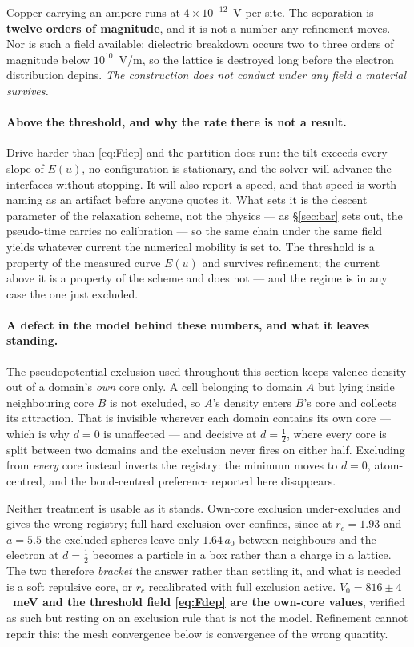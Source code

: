 \documentclass[11pt]{article}
\begin{document}
Copper carrying an ampere runs at $4\times10^{-12}$~V per site. The separation is \textbf{twelve
orders of magnitude}, and it is not a number any refinement moves. Nor is such a field available:
dielectric breakdown occurs two to three orders of magnitude below $10^{10}$~V/m, so the lattice is
destroyed long before the electron distribution depins. \emph{The construction does not conduct
under any field a material survives.}

\paragraph{Above the threshold, and why the rate there is not a result.} Drive harder than
\eqref{eq:Fdep} and the partition does run: the tilt exceeds every slope of $E(u)$, no configuration
is stationary, and the solver will advance the interfaces without stopping. It will also report a
speed, and that speed is worth naming as an artifact before anyone quotes it. What sets it is the
descent parameter of the relaxation scheme, not the physics --- as \S\ref{sec:bar} sets out, the
pseudo-time carries no calibration --- so the same chain under the same field yields whatever current
the numerical mobility is set to. The threshold is a property of the measured curve $E(u)$ and
survives refinement; the current above it is a property of the scheme and does not --- and the
regime is in any case the one just excluded.

\paragraph{A defect in the model behind these numbers, and what it leaves standing.} The
pseudopotential exclusion used throughout this section keeps valence density out of a domain's
\emph{own} core only. A cell belonging to domain $A$ but lying inside neighbouring core $B$ is not
excluded, so $A$'s density enters $B$'s core and collects its attraction. That is invisible wherever
each domain contains its own core --- which is why $d=0$ is unaffected --- and decisive at
$d=\tfrac12$, where every core is split between two domains and the exclusion never fires on either
half. Excluding from \emph{every} core instead inverts the registry: the minimum moves to $d=0$,
atom-centred, and the bond-centred preference reported here disappears.

Neither treatment is usable as it stands. Own-core exclusion under-excludes and gives the wrong
registry; full hard exclusion over-confines, since at $r_c=1.93$ and $a=5.5$ the excluded spheres
leave only $1.64\,a_0$ between neighbours and the electron at $d=\tfrac12$ becomes a particle in a
box rather than a charge in a lattice. The two therefore \emph{bracket} the answer rather than
settling it, and what is needed is a soft repulsive core, or $r_c$ recalibrated with full exclusion
active. \textbf{$V_0=816\pm4$~meV and the threshold field \eqref{eq:Fdep} are the own-core values},
verified as such but resting on an exclusion rule that is not the model. Refinement cannot repair
this: the mesh convergence below is convergence of the wrong quantity.
\end{document}
